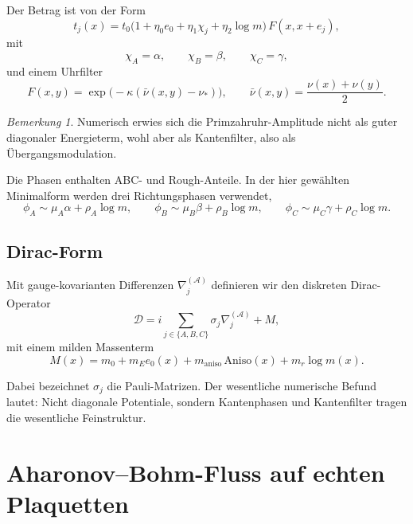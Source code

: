 \documentclass[11pt,a4paper]{article}
\theoremstyle{remark}
\newtheorem{bemerkung}[definition]{Bemerkung}
\newcommand{\Acal}{\mathcal{A}}
\newcommand{\Dcal}{\mathcal{D}}
\begin{document}
	Der Betrag ist von der Form
	\begin{equation}
		t_j(x)=t_0\bigl(1+\eta_0 e_0 + \eta_1\chi_j + \eta_2\log m\bigr)
		\,F(x,x+e_j),
	\end{equation}
	mit
	\begin{equation}
		\chi_A=\alpha,
		\qquad
		\chi_B=\beta,
		\qquad
		\chi_C=\gamma,
	\end{equation}
	und einem Uhrfilter
	\begin{equation}
		F(x,y)=\exp\!\bigl(-\kappa(\bar\nu(x,y)-\nu_*)\bigr),
		\qquad
		\bar\nu(x,y)=\frac{\nu(x)+\nu(y)}{2}.
	\end{equation}
	
	\begin{bemerkung}
		Numerisch erwies sich die Primzahruhr-Amplitude nicht als guter diagonaler Energieterm, wohl aber als Kantenfilter, also als Übergangsmodulation.
	\end{bemerkung}
	
	Die Phasen enthalten ABC- und Rough-Anteile. In der hier gewählten Minimalform werden drei Richtungsphasen verwendet,
	\begin{equation}
		\phi_A \sim \mu_A\alpha + \rho_A \log m,
		\qquad
		\phi_B \sim \mu_B\beta + \rho_B \log m,
		\qquad
		\phi_C \sim \mu_C\gamma + \rho_C \log m.
	\end{equation}
	
	\subsection{Dirac-Form}
	
	Mit gauge-kovarianten Differenzen $\nabla_j^{(\Acal)}$ definieren wir den diskreten Dirac-Operator
	\begin{equation}
		\Dcal
		=
		i\sum_{j\in\{A,B,C\}} \sigma_j\nabla_j^{(\Acal)} + M,
	\end{equation}
	mit einem milden Massenterm
	\begin{equation}
		M(x)=m_0+m_E e_0(x)+m_{\mathrm{aniso}}\,\mathrm{Aniso}(x)+m_r\log m(x).
	\end{equation}
	
	Dabei bezeichnet $\sigma_j$ die Pauli-Matrizen. Der wesentliche numerische Befund lautet: Nicht diagonale Potentiale, sondern Kantenphasen und Kantenfilter tragen die wesentliche Feinstruktur.
	
	\section{Aharonov--Bohm-Fluss auf echten Plaquetten}
	
\end{document}
